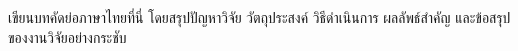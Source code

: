 \begin{sutabstractth}
เขียนบทคัดย่อภาษาไทยที่นี่ โดยสรุปปัญหาวิจัย วัตถุประสงค์ วิธีดำเนินการ ผลลัพธ์สำคัญ และข้อสรุปของงานวิจัยอย่างกระชับ
\end{sutabstractth}
